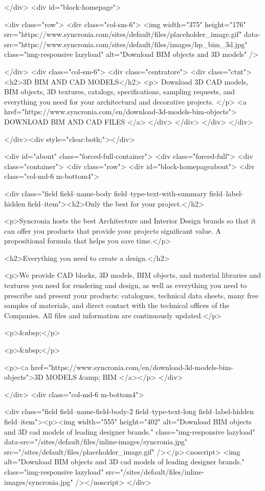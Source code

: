 </div>
<div  id="block-homepage">

		
	<div class="row">
		<div class="col-sm-6">
			<img width="375" height="176" src="https://www.syncronia.com/sites/default/files/placeholder_image.gif" data-src="https://www.syncronia.com/sites/default/files/images/hp_bim_3d.jpg" class="img-responsive lazyload" alt="Download BIM objects and 3D models" />

		</div>
		<div class="col-sm-6">
			<div class="centratore">
				<div class="ctnt">
					<h2>3D BIM AND CAD MODELS</h2>
					<p>
						Download 3D CAD models, BIM objects, 3D textures, catalogs, specifications, sampling requests, and everything you need for your architectural and decorative projects.
					</p>
					<a href="https://www.syncronia.com/en/download-3d-models-bim-objects">
						DOWNLOAD BIM AND CAD FILES
					</a>
				</div>
			</div>
		</div>
	</div>

</div><div style="clear:both;"></div>

<div id="about" class="forced-full-container">
	<div class="forced-full">
		<div class="container">
			<div class="row">
				<div id="block-homepageabout">
					<div class="col-md-6 m-bottom4">
						
            <div class="field field--name-body field--type-text-with-summary field--label-hidden field--item"><h2>Only the best for your project.</h2>

<p>Syncronia hosts the best Architecture and Interior Design brands so that it can offer you products that provide your projects significant value. A propositional formula that helps you save time.</p>

<h2>Everything you need to create a design.</h2>

<p>We provide CAD blocks, 3D models, BIM objects, and material libraries and textures you need for rendering and design, as well as everything you need to prescribe and present your products: catalogues, technical data sheets, many free samples of materials, and direct contact with the technical offices of the Companies. All files and information are continuously updated.</p>

<p>&nbsp;</p>

<p>&nbsp;</p>

<p><a href="https://www.syncronia.com/en/download-3d-models-bim-objects">3D MODELS &amp; BIM </a></p>
</div>
      
						
					</div>
					<div class="col-md-6 m-bottom4">
						
            <div class="field field--name-field-body-2 field--type-text-long field--label-hidden field--item"><p><img width="555" height="402" alt="Download BIM objects and 3D cad models of leading designer brands." class="img-responsive lazyload" data-src="/sites/default/files/inline-images/syncronia.jpg" src="/sites/default/files/placeholder_image.gif" /></p><noscript>
<img alt="Download BIM objects and 3D cad models of leading designer brands." class="img-responsive lazyload" src="/sites/default/files/inline-images/syncronia.jpg" /></noscript>
</div>
      
